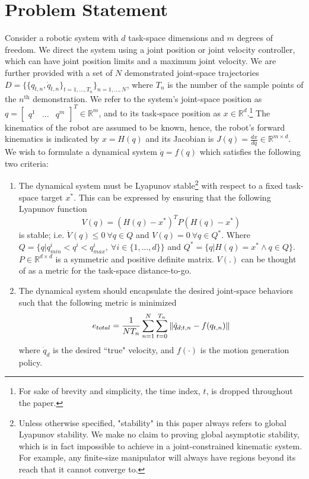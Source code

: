 \documentclass[letterpaper, 10 pt, conference,fleqn]{ieeeconf}
\begin{document}
\section{Problem Statement} \label{Sec:Prob}
Consider a robotic system with $d$ task-space dimensions and $m$ degrees of freedom. We direct the system using a joint position or joint velocity controller, which can have joint position limits and a maximum joint velocity. We are further provided with a set of $N$ demonstrated joint-space trajectories $D=\{\{q_{t,n},\dot{q}_{t,n}\}_{t=1,\dots, T_n}\}_{n=1,\dots,N}$, where $T_n$ is the number of the sample points of the $n^{\text{th}}$ demonstration. We refer to the system's joint-space position as $q=\begin{bmatrix} q^1 & \dots & q^m
\end{bmatrix}^T \in \mathbb{R}^m$, and to its task-space position as $x\in \mathbb{R}^d$.\footnote{For sake of brevity and simplicity, the time index, $t$, is dropped throughout the paper. } The kinematics of the robot are assumed to be known, hence, the robot's forward kinematics is indicated by $x = H(q)$ and its Jacobian is $J(q) = \frac{dx}{dq}\in \mathbb{R}^{m\times d}$.\\
We wish to formulate a dynamical system $\dot{q} = f(q)$ which satisfies the following two criteria:
\renewcommand{\labelenumi}{(\Roman{enumi})}
\begin{enumerate}
\item The dynamical system must be Lyapunov stable\footnote{Unless otherwise specified, "stability" in this paper always refers to global Lyapunov stability. We make no claim to proving global asymptotic stability, which is in fact impossible to achieve in a joint-constrained kinematic system. For example, any finite-size manipulator will always have regions beyond its reach that it cannot converge to.} with respect to a fixed task-space target $x^*$. This can be expressed by ensuring that the following Lyapunov function
\begin{equation}
V(q) = (H(q) - x^*)^TP(H(q) - x^*) 
\label{eq:Lyp}
\end{equation}
is stable; i.e. $\dot{V}(q)\leq0 ~\forall q\in Q$ and $V(q)=0~ \forall q\in Q^*$. Where  $Q=\{q|q^i_{min} < q^i < q^i_{max},~\forall i\in \{1,\dots,d\}\}$ and $Q^*=\{q|H(q)=x^*\wedge q\in Q\}$. $P\in \mathbb{R}^{d\times d} $ is a symmetric and positive definite matrix. $V(.)$ can be thought of as a metric for the task-space distance-to-go.
\item The dynamical system should encapsulate the desired joint-space behaviors such that the following metric is minimized
\begin{equation}
\vspace{-5pt}
e_{total} = \frac{1}{NT_n}\sum_{n=1}^N\sum_{t=0}^{T_n} \left \| \dot{q}_{d; t,n} - f(q_{t,n}) \right \|
\label{eq:optim_error}
\end{equation}
  where $\dot{q}_d$ is the desired ``true" velocity, and $f(\cdot)$ is the motion generation policy.
\end{enumerate}
\end{document}
